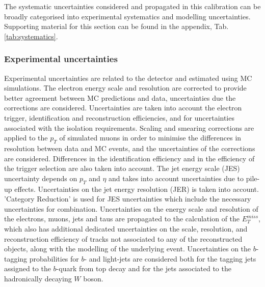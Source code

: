 \documentclass[letterpaper,12pt]{article}
\begin{document}
The systematic uncertainties considered and propagated in this calibration can be broadly categorised into experimental systematics and modelling uncertainties. Supporting material for this section can be found in the appendix, Tab.\ref{tab:systematics}.
\subsubsection{Experimental uncertainties}

Experimental uncertainties are related to the detector and estimated using MC simulations. The electron energy scale and resolution are corrected to provide better agreement between MC predictions and data, uncertainties due the corrections are considered. Uncertainties are taken into account the electron trigger, identification and reconstruction efficiencies, and for uncertainties associated with the isolation requirements. Scaling and smearing corrections are applied to the $p_T$ of simulated muons in order to minimise the differences in resolution between data and MC events, and the uncertainties of the corrections are considered. Differences in the identification efficiency and in the efficiency of the trigger selection are also taken into account. The jet energy scale (JES) uncertainty depends on $p_T$ and $\eta$ and takes into account uncertainties due to pile-up effects. Uncertainties on the jet energy resolution (JER) is taken into account. 'Category Reduction' is used for JES uncertainties which include the necessary uncertainties for combination. Uncertainties on the energy scale and resolution of the electrons, muons, jets and taus are propagated to the calculation of the $E_T^{miss}$, which also has additional dedicated uncertainties on the scale, resolution, and reconstruction efficiency of tracks not associated to any of the reconstructed objects, along with the modelling of the underlying event. Uncertainties on the $b$-tagging probabilities for $b$- and light-jets are considered both for the tagging jets assigned to the $b$-quark from top decay and for the jets associated to the hadronically decaying $W$ boson.
\end{document}

